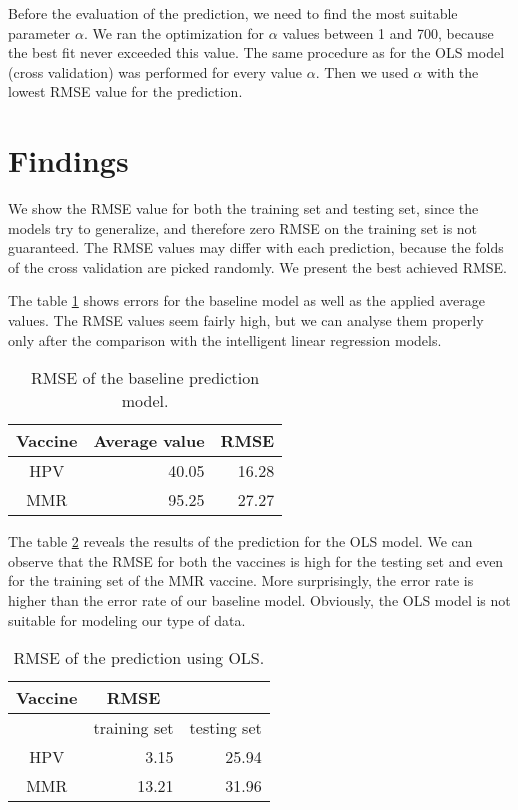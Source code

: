 \documentclass{sig-alternate}
\begin{document}
Before the evaluation of the prediction, we need to find the most suitable parameter $\alpha$.
We ran the optimization for $\alpha$ values between 1 and 700, because the best fit never exceeded this value.
The same procedure as for the OLS model (cross validation) was performed for every value $\alpha$.
Then we used $\alpha$ with the lowest RMSE value for the prediction.

\section{Findings}
We show the RMSE value for both the training set and testing set, since the models try to generalize, and therefore zero RMSE on the training set is not guaranteed. The RMSE values may differ with each prediction, because the folds of the cross validation are picked randomly. We present the best achieved RMSE.

The table \ref{avg} shows errors for the baseline model as well as the applied average values.
The RMSE values seem fairly high, but we can analyse them properly only after the comparison with the intelligent linear regression models.

\begin{table}[H]
\centering
\caption{RMSE of the baseline prediction model.}
\label{avg}
\begin{tabular}{|c|r|r|} \hline
Vaccine&Average value&RMSE\\ \hline
HPV & 40.05 & 16.28\\ \hline
MMR & 95.25 & 27.27\\ \hline
\end{tabular}
\end{table}

The table \ref{ols} reveals the results of the prediction for the OLS model.
We can observe that the RMSE for both the vaccines is high for the testing set and even for the training set of the MMR vaccine.
More surprisingly, the error rate is higher than the error rate of our baseline model.
Obviously, the OLS model is not suitable for modeling our type of data.

\begin{table}[h]
\centering
\caption{RMSE of the prediction using OLS.}
\label{ols}
\begin{tabular}{|c|r|r|} \hline
Vaccine& \multicolumn{1}{c}{RMSE}&\\ \hline
&training set&testing set\\ \hline
HPV & 3.15 & 25.94\\ \hline
MMR & 13.21 & 31.96\\ \hline
\end{tabular}
\end{table}
\end{document}
